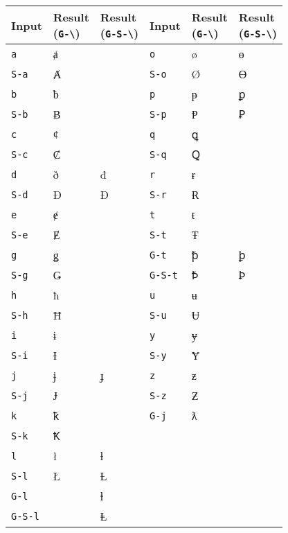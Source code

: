 \documentclass[oneside]{memoir}
\newcommand{\key}{\verb}
\newcommand{\keynv}{\texttt}
\begin{document}
\begin{table}[!b]
\begin{minipage}{0.55\paperwidth}
\begin{tabular}{lll@{\hspace{1cm}}lll}
\toprule
Input
 & \makecell{Result\\(\keynv{G-\textbackslash})}
 & \makecell{Result\\(\keynv{G-S-\textbackslash})}
& Input
 & \makecell{Result\\(\keynv{G-\textbackslash})}
 & \makecell{Result\\(\keynv{G-S-\textbackslash})} \\
\midrule
\key|a|   & ⱥ &   & \key|o|     & ø & ɵ \\
\key|S-a| & Ⱥ &   & \key|S-o|   & Ø & Ɵ \\
\key|b|   & ƀ &   & \key|p|     & ᵽ & ꝑ \\
\key|S-b| & Ƀ &   & \key|S-p|   & Ᵽ & Ꝑ \\
\key|c|   & ȼ &   & \key|q|     & ꝗ &   \\
\key|S-c| & Ȼ &   & \key|S-q|   & Ꝗ &   \\
\key|d|   & ð & đ & \key|r|     & ɍ &   \\
\key|S-d| & Ð & Đ & \key|S-r|   & Ɍ &   \\
\key|e|   & ɇ &   & \key|t|     & ŧ &   \\
\key|S-e| & Ɇ &   & \key|S-t|   & Ŧ &   \\
\key|g|   & ǥ &   & \key|G-t|   & ꝥ & ꝧ \\
\key|S-g| & Ǥ &   & \key|G-S-t| & Ꝥ & Ꝧ \\
\key|h|   & ħ &   & \key|u|     & ʉ & \\
\key|S-h| & Ħ &   & \key|S-u|   & Ʉ & \\
\key|i|   & ɨ &   & \key|y|     & ɏ & \\
\key|S-i| & Ɨ &   & \key|S-y|   & Ɏ & \\
\key|j|   & ɉ & ɟ & \key|z|     & ƶ & \\
\key|S-j| & Ɉ &   & \key|S-z|   & Ƶ & \\
\key|k|   & ꝁ &   & \key|G-j|   & ƛ & \\
\key|S-k| & Ꝁ &   &             &   & \\
\key|l|   & ł & ƚ &             &   & \\
\key|S-l| & Ł & Ƚ &             &   & \\
\key|G-l| &   & ⱡ &             &   & \\
\key|G-S-l| & & Ⱡ &             &   & \\
\bottomrule
\end{tabular}
\end{minipage}
\end{table}
\end{document}
